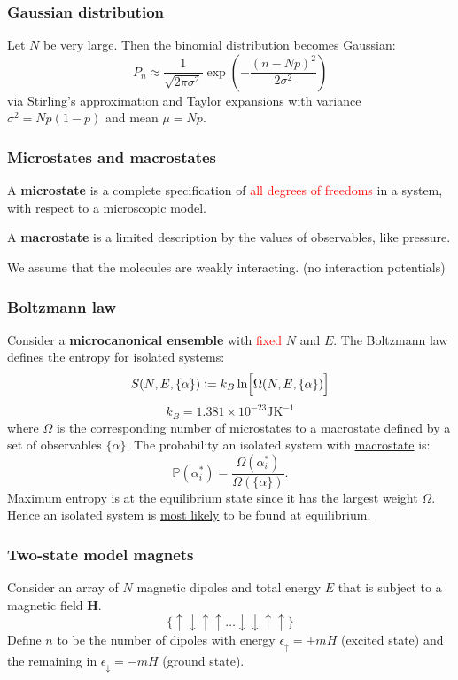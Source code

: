\documentclass{article}
\newcommand{\deq}{\vcentcolon=}
\newcommand{\vc}[1]{\boldsymbol{#1}}
\begin{document}
\begin{multicols*}{3}
\subsubsection*{Gaussian distribution}
Let $N$ be very large. Then the binomial distribution
becomes Gaussian:
$$P_n\approx\frac{1}{\sqrt{2\pi\sigma^2}}
\exp\left(-\frac{(n-Np)^2}{2\sigma^2}\right)$$
via Stirling's approximation and Taylor expansions
with variance $\sigma^2=Np(1-p)$ and mean $\mu=Np$.

\subsubsection*{Microstates and macrostates}
A \textbf{microstate} is a complete specification of
\textcolor{red}{all degrees of freedoms} in a system,
with respect to a microscopic model.

A \textbf{macrostate} is a limited description
by the values of observables, like pressure.

We assume that the molecules are
weakly interacting. (no interaction potentials)

\subsubsection*{Boltzmann law}
Consider a \textbf{microcanonical ensemble} with
\textcolor{red}{fixed} $N$ and $E$.
The Boltzmann law defines the entropy
for isolated systems:
$$S(N,E,\{\alpha\})\deq k_B\ln\Bigl[
\Omega(N,E,\{\alpha\})\Bigr]$$
$$k_B=1.381\times10^{-23}\text{J}\text{K}^{-1}$$
where $\Omega$ is the corresponding number of microstates
to a macrostate defined by a set of observables $\{\alpha\}$.
The probability an isolated system with
\underline{macrostate} is:
$$\mathbb{P}(\alpha^*_i)=
\frac{\Omega(\alpha^*_i)}{\Omega(\{\alpha\})}.$$
Maximum entropy is at the equilibrium state 
since it has the largest weight $\Omega$. Hence an
isolated system is \underline{most likely}
to be found at equilibrium.

\subsubsection*{Two-state model magnets}
Consider an array of $N$ magnetic dipoles 
and total energy $E$
that is subject to a magnetic field $\vc{H}$.
$$\{\uparrow\downarrow\uparrow\uparrow\dots
\downarrow\downarrow\uparrow\uparrow\}$$
Define $n$ to be the number of
dipoles with energy $\epsilon_{\uparrow}=+mH$
(excited state) and the remaining
in $\epsilon_{\downarrow}=-mH$ (ground state).


\end{multicols*}
\end{document}
